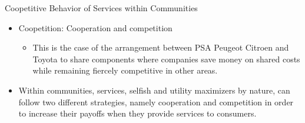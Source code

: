 \documentclass{beamer}
\begin{document}
\begin{frame}{Coopetitive Behavior of Services within Communities}
    \begin{itemize}
        \item Coopetition: Cooperation and competition
        
        \begin{itemize}
            \item This is the case of the arrangement between PSA Peugeot Citroen and Toyota to share components where companies save money on shared costs while remaining fiercely competitive in other areas.
        \end{itemize}
        
        \item Within communities, services, selfish and utility maximizers by nature, can follow two different strategies, namely {\color{blue}cooperation} and {\color{blue}competition} in order to increase their payoffs when they provide services to consumers.
    \end{itemize}
\end{frame}
\end{document}
